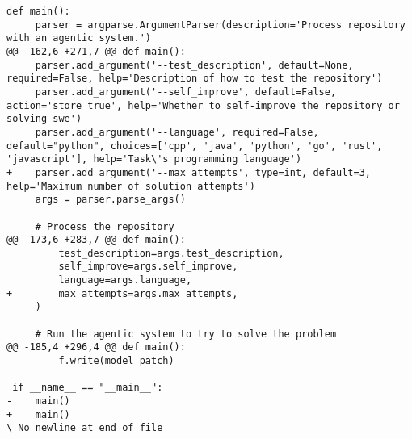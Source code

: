 \begin{lstlisting}[style=diffstyle]
 def main():
     parser = argparse.ArgumentParser(description='Process repository with an agentic system.')
@@ -162,6 +271,7 @@ def main():
     parser.add_argument('--test_description', default=None, required=False, help='Description of how to test the repository')
     parser.add_argument('--self_improve', default=False, action='store_true', help='Whether to self-improve the repository or solving swe')
     parser.add_argument('--language', required=False, default="python", choices=['cpp', 'java', 'python', 'go', 'rust', 'javascript'], help='Task\'s programming language')
+    parser.add_argument('--max_attempts', type=int, default=3, help='Maximum number of solution attempts')
     args = parser.parse_args()
 
     # Process the repository
@@ -173,6 +283,7 @@ def main():
         test_description=args.test_description,
         self_improve=args.self_improve,
         language=args.language,
+        max_attempts=args.max_attempts,
     )
 
     # Run the agentic system to try to solve the problem
@@ -185,4 +296,4 @@ def main():
         f.write(model_patch)
 
 if __name__ == "__main__":
-    main()
+    main()
\ No newline at end of file
\end{lstlisting}